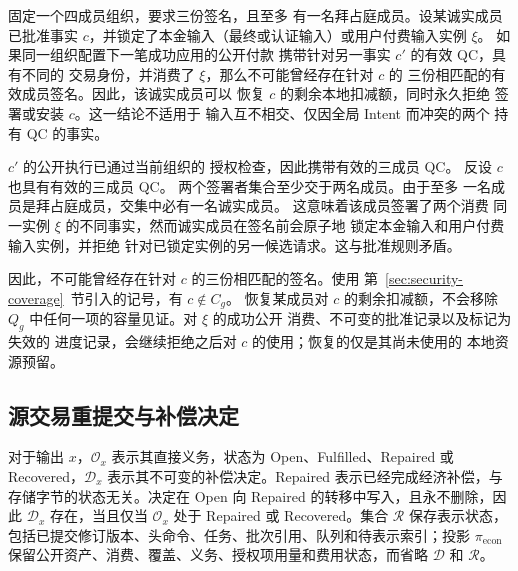 \begin{lemma}[被取代的部分批准]
\label{lem:security-superseded}
固定一个四成员组织，要求三份签名，且至多
有一名拜占庭成员。设某诚实成员已批准事实
$c$，并锁定了本金输入（最终或认证输入）或用户付费输入实例 $\xi$。
如果同一组织配置下一笔成功应用的公开付款
携带针对另一事实 $c'$ 的有效 QC，具有不同的
交易身份，并消费了 $\xi$，那么不可能曾经存在针对 $c$ 的
三份相匹配的有效成员签名。因此，该诚实成员可以
恢复 $c$ 的剩余本地扣减额，同时永久拒绝
签署或安装 $c$。这一结论不适用于
输入互不相交、仅因全局 Intent 而冲突的两个
持有 QC 的事实。
\end{lemma}

\begin{IEEEproof}
$c'$ 的公开执行已通过当前组织的
授权检查，因此携带有效的三成员 QC。
反设 $c$ 也具有有效的三成员 QC。
两个签署者集合至少交于两名成员。由于至多
一名成员是拜占庭成员，交集中必有一名诚实成员。
这意味着该成员签署了两个消费
同一实例 $\xi$ 的不同事实，然而诚实成员在签名前会原子地
锁定本金输入和用户付费输入实例，并拒绝
针对已锁定实例的另一候选请求。这与批准规则矛盾。

因此，不可能曾经存在针对 $c$ 的三份相匹配的签名。使用
第~\ref{sec:security-coverage}~节引入的记号，有 $c\notin C_g$。
恢复某成员对 $c$ 的剩余扣减额，不会移除
$Q_g$ 中任何一项的容量见证。对 $\xi$ 的成功公开
消费、不可变的批准记录以及标记为失效的
进度记录，会继续拒绝之后对 $c$ 的使用；恢复的仅是其尚未使用的
本地资源预留。
\end{IEEEproof}

\subsection{源交易重提交与补偿决定}
\label{sec:security-decision}

对于输出 $x$，$\mathcal O_x$ 表示其直接义务，状态为 Open、Fulfilled、Repaired 或 Recovered，$\mathcal D_x$ 表示其不可变的补偿决定。Repaired 表示已经完成经济补偿，与存储字节的状态无关。决定在 Open 向 Repaired 的转移中写入，且永不删除，因此 $\mathcal D_x$ 存在，当且仅当 $\mathcal O_x$ 处于 Repaired 或 Recovered。集合 $\mathcal R$ 保存表示状态，包括已提交修订版本、头命令、任务、批次引用、队列和待表示索引；投影 $\pi_{\mathrm{econ}}$ 保留公开资产、消费、覆盖、义务、授权项用量和费用状态，而省略 $\mathcal D$ 和 $\mathcal R$。

